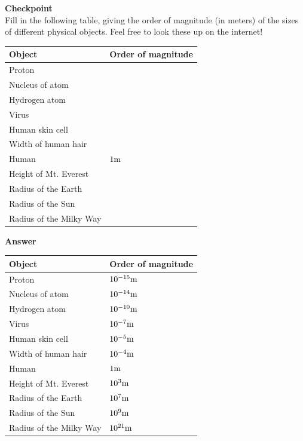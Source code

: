 \begin{framed}
\textbf{Checkpoint}\\
Fill in the following table, giving the order of magnitude (in meters) of the sizes of different physical objects. Feel free to look these up on the internet!

\begin{table}
\centering
\begin{tabular}{p{}p{}}
\toprule
\textbf{Object} & \textbf{Order of magnitude} \\
\hline
Proton &  \\
Nucleus of atom &  \\
Hydrogen atom &  \\
Virus &  \\
Human skin cell &  \\
Width of human hair &  \\
Human & $1 {\rm m}$ \\
Height of Mt. Everest &  \\
Radius of the Earth &  \\
Radius of the Sun &  \\
Radius of the Milky Way &  \\
\bottomrule
\end{tabular}
\end{table}

\begin{framed}
\textbf{Answer}\\
\begin{table}
\centering
\begin{tabular}{p{}p{}}
\toprule
\textbf{Object} & \textbf{Order of magnitude} \\
\hline
Proton & $10^{ -15} {\rm m}$ \\
Nucleus of atom & $10^{ -14} {\rm m}$ \\
Hydrogen atom & $10^{ -10} {\rm m}$ \\
Virus & $10^{ -7} {\rm m}$ \\
Human skin cell & $10^{ -5} {\rm m}$ \\
Width of human hair & $10^{ -4} {\rm m}$ \\
Human & $1 {\rm m}$ \\
Height of Mt. Everest & $10^{3} {\rm m}$ \\
Radius of the Earth & $10^{7} {\rm m}$ \\
Radius of the Sun & $10^{9} {\rm m}$ \\
Radius of the Milky Way & $10^{21} {\rm m}$ \\
\bottomrule
\end{tabular}
\end{table}
\end{framed}
\end{framed}


